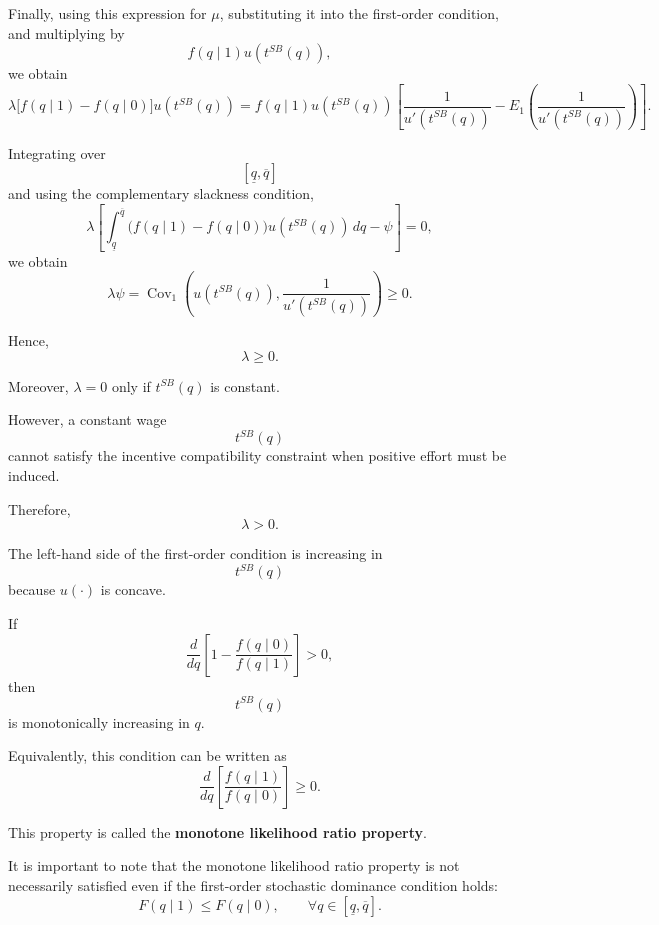 Finally, using this expression for \(\mu\), substituting it into the first-order condition, and multiplying by
\[
f(q\mid 1)u(t^{SB}(q)),
\]
we obtain
\[
\lambda
\bigl[
f(q\mid 1)-f(q\mid 0)
\bigr]
u(t^{SB}(q))
=
f(q\mid 1)u(t^{SB}(q))
\left[
\frac{1}{u'(t^{SB}(q))}
-
E_1\left(
\frac{1}{u'(t^{SB}(q))}
\right)
\right].
\]

Integrating over
\[
[\underline q,\overline q]
\]
and using the complementary slackness condition,
\[
\lambda
\left[
\int_{\underline q}^{\overline q}
\bigl(f(q\mid 1)-f(q\mid 0)\bigr)
u(t^{SB}(q))\,dq
-
\psi
\right]
=
0,
\]
we obtain
\[
\lambda\psi
=
\operatorname{Cov}_1
\left(
u(t^{SB}(q)),
\frac{1}{u'(t^{SB}(q))}
\right)
\ge 0.
\]

Hence,
\[
\lambda\ge 0.
\]

Moreover, \(\lambda=0\) only if \(t^{SB}(q)\) is constant.

However, a constant wage
\[
t^{SB}(q)
\]
cannot satisfy the incentive compatibility constraint when positive effort must be induced.

Therefore,
\[
\lambda>0.
\]

The left-hand side of the first-order condition is increasing in
\[
t^{SB}(q)
\]
because \(u(\cdot)\) is concave.

If
\[
\frac{d}{dq}
\left[
1-
\frac{f(q\mid 0)}{f(q\mid 1)}
\right]
>0,
\]
then
\[
t^{SB}(q)
\]
is monotonically increasing in \(q\).

Equivalently, this condition can be written as
\[
\frac{d}{dq}
\left[
\frac{f(q\mid 1)}{f(q\mid 0)}
\right]
\ge 0.
\]

This property is called the \textbf{monotone likelihood ratio property}.

It is important to note that the monotone likelihood ratio property is not necessarily satisfied even if the first-order stochastic dominance condition holds:
\[
F(q\mid 1)\le F(q\mid 0),
\qquad
\forall q\in[\underline q,\overline q].
\]







